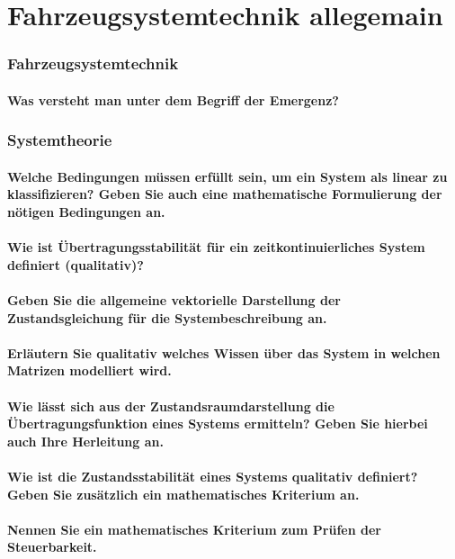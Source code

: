 \setcounter{section}{0}
\part{Fahrzeugsystemtechnik allegemain}
\section{Fahrzeugsystemtechnik}
\subsection{Was versteht man unter dem Begriff der Emergenz?}

\section{Systemtheorie}
\subsection{Welche Bedingungen müssen erfüllt sein, um ein System als linear zu klassifizieren?
    Geben Sie auch eine mathematische Formulierung der nötigen Bedingungen an.}
\subsection{Wie ist Übertragungsstabilität für ein zeitkontinuierliches System definiert (qualitativ)?}
\subsection{Geben Sie die allgemeine vektorielle Darstellung der Zustandsgleichung für die Systembeschreibung an. }
\subsection{Erläutern Sie qualitativ welches Wissen über das System in welchen Matrizen modelliert wird.}
\subsection{Wie lässt sich aus der Zustandsraumdarstellung die Übertragungsfunktion eines Systems ermitteln? Geben
    Sie hierbei auch Ihre Herleitung an.}
\subsection{Wie ist die Zustandsstabilität eines Systems qualitativ definiert? Geben Sie zusätzlich ein mathematisches
    Kriterium an.}
\subsection{Nennen Sie ein mathematisches Kriterium zum Prüfen der Steuerbarkeit. }